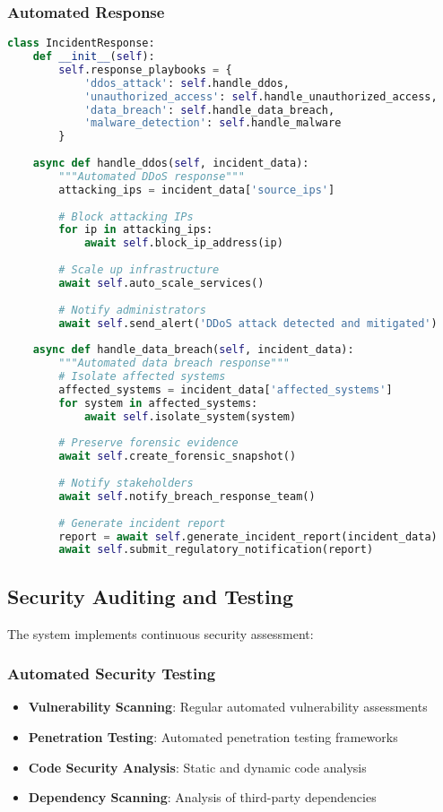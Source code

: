 \subsubsection{Automated Response}
\begin{lstlisting}[language=python, caption=Automated Incident Response]
class IncidentResponse:
    def __init__(self):
        self.response_playbooks = {
            'ddos_attack': self.handle_ddos,
            'unauthorized_access': self.handle_unauthorized_access,
            'data_breach': self.handle_data_breach,
            'malware_detection': self.handle_malware
        }
        
    async def handle_ddos(self, incident_data):
        """Automated DDoS response"""
        attacking_ips = incident_data['source_ips']
        
        # Block attacking IPs
        for ip in attacking_ips:
            await self.block_ip_address(ip)
            
        # Scale up infrastructure
        await self.auto_scale_services()
        
        # Notify administrators
        await self.send_alert('DDoS attack detected and mitigated')
        
    async def handle_data_breach(self, incident_data):
        """Automated data breach response"""
        # Isolate affected systems
        affected_systems = incident_data['affected_systems']
        for system in affected_systems:
            await self.isolate_system(system)
            
        # Preserve forensic evidence
        await self.create_forensic_snapshot()
        
        # Notify stakeholders
        await self.notify_breach_response_team()
        
        # Generate incident report
        report = await self.generate_incident_report(incident_data)
        await self.submit_regulatory_notification(report)
\end{lstlisting}

\subsection{Security Auditing and Testing}

The system implements continuous security assessment:

\subsubsection{Automated Security Testing}
\begin{itemize}
    \item \textbf{Vulnerability Scanning}: Regular automated vulnerability assessments
    \item \textbf{Penetration Testing}: Automated penetration testing frameworks
    \item \textbf{Code Security Analysis}: Static and dynamic code analysis
    \item \textbf{Dependency Scanning}: Analysis of third-party dependencies
\end{itemize}

